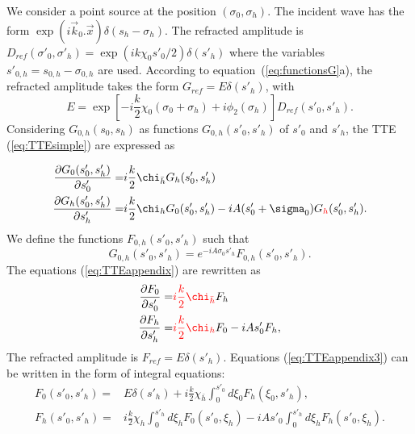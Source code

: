 \documentclass[preprint]{iucr}              %
\newcommand{\inred}[1]{{\color{red}#1}}
\begin{document}
\inred{We consider a point source at the position $(\sigma_0,\sigma_h)$. The incident wave has the form $\exp(i\vec k_0 . \vec x) \delta(s_h-\sigma_h)$.}
The refracted amplitude is $D_{ref}(\sigma'_0,\sigma'_h)=\exp(i k \chi_0 s'_0/2)\delta(s'_h)$ \inred{where} the variables $s'_{0,h}=s_{0,h}-\sigma_{0,h}$ \inred{are used}.
According to equation~(\ref{eq:functionsG}\inred{a}), the refracted amplitude takes the form \inred{$G_{ref}=E \delta(s'_h)$, with}
\begin{equation}
\label{eq:appE}
    E =\exp[-i\frac{k}{2}\chi_0(\sigma_0+\sigma_h)+i \phi_2(\sigma_h)] D_{ref}(s'_0,s'_h).
\end{equation}
Considering $G_{0,h}(s_0,s_h)$  as functions $G_{0,h}(s'_0,s'_h)$ of $s'_0$ and $s'_h$, the TTE (\ref{eq:TTEsimple}) are expressed as

\begin{subequations}
\label{eq:TTEappendix}
\begin{align}
    \frac{\partial G_0(s'_0,s'_h)}{\partial s'_0}=&i\frac{k}{2}\chi_{\bar h} G_h(s'_0,s'_h) \\
    \frac{\partial G_h(s'_0,s'_h)}{\partial s'_h}=&i\frac{k}{2}\chi_{h} G_0(s'_0,s'_h) -i A (s'_0+\sigma_0)G\inred{_h}(s'_0,s'_h).
\end{align}
\end{subequations}
\inred{We define} the functions $F_{0,h}(s'_0,s'_h)$ such that
\begin{equation}
\label{eq:TTEappendix2}
    G_{0,h}(s'_0,s'_h) = e^{-iA\sigma_0s'_h} F_{0,h}(s'_0,s'_h).
\end{equation}
\inred{The} equations (\ref{eq:TTEappendix}) are rewritten as
\begin{subequations}
\label{eq:TTEappendix3}
\begin{align}
    \frac{\partial F_0}{\partial s'_0}=&\inred{i\frac{k}{2} \chi_{\bar h}} F_h \\
    \frac{\partial F_h}{\partial s'_h}=& \inred{i\frac{k}{2}\chi_{h}}F_0-i A s'_0 F_h,
\end{align}
\end{subequations}
The refracted amplitude is $F_{ref}=E\delta(s'_h)$. 
Equations (\ref{eq:TTEappendix3}) can be written in the form of integral equations:
\begin{subequations}
\label{eq:TTEappendixIntegral}
\begin{align}
    F_0(s'_0,s'_h) =& E \delta(s'_h) +i\frac{k}{2}\chi_{\bar h}\int_0^{s'_0} d\xi_0F_h(\xi_0,s'_h),\\
    F_h(s'_0,s'_h)=& i\frac{k}{2}\chi_{h}\int_0^{s'_h} d\xi_h F_0(s'_0,\xi_h) - i A s'_0 \int_0^{s'_h} d\xi_h F_h(s'_0,\xi_h).
\end{align}
\end{subequations}
\end{document}
